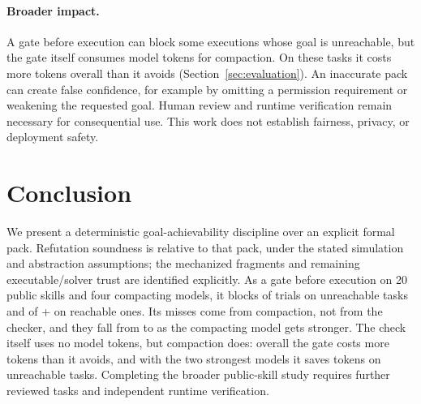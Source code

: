\documentclass{article}
\theoremstyle{plain}
\theoremstyle{definition}
\newcommand{\bnew}{\begingroup\color{revblue}}
\newcommand{\bnew}{\begingroup}
\newcommand{\enew}{\endgroup}
\begin{document}
%
\paragraph{Broader impact.}
A gate before execution can block some executions whose goal is
unreachable, but the gate itself consumes model tokens for compaction. On
these tasks it costs more tokens overall than it avoids
(Section~\ref{sec:evaluation}). An inaccurate pack can create false confidence,
for example by omitting a permission requirement or weakening the requested
goal. Human review and runtime verification remain necessary for
consequential use. This work does not establish fairness, privacy, or
deployment safety.

\section{Conclusion}\label{sec:conclusion}

%
We present a deterministic goal-achievability discipline over an explicit
formal pack. Refutation soundness is relative to that pack, under the
stated simulation and abstraction assumptions; the mechanized fragments
and remaining executable/solver trust are identified explicitly.
As a gate before execution on 20 public skills and four compacting models,
it blocks \ValueTP{} of \ValueFailed{} trials on unreachable tasks and
\ValueFP{} of \ValueFP{}+\ValueTN{} on reachable ones. Its misses come from compaction, not from the
checker, and they fall from \ValueCodexFN{} to \ValueOpusFN{} as the
compacting model gets stronger. The check itself uses no model tokens, but
compaction does: overall the gate costs more tokens than it avoids, and with
the two strongest models it saves tokens on unreachable tasks. Completing the broader
public-skill study requires further reviewed tasks and independent runtime
verification.
\end{document}
